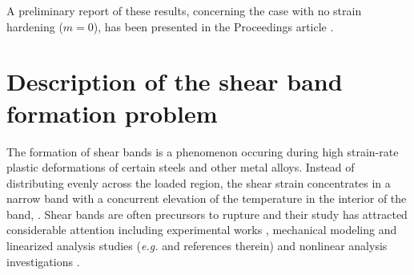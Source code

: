 \documentclass[11pt]{article}
\theoremstyle{remark}
\begin{document}



A preliminary report of these results, concerning the case with no strain hardening ($m = 0$), has been presented in the
Proceedings article \cite{KLT_HYP2016}.


\section{Description of the shear band formation problem}
\label{mathmodel}

The formation of shear bands \cite{CCHD,ZH}  is a phenomenon occuring during
high strain-rate plastic deformations of certain steels and other metal alloys. Instead of distributing evenly across the loaded region,
the shear strain concentrates in a narrow band with a concurrent elevation of the temperature in the interior of the band, \cite{ZH,CCHD,HDH}.
Shear bands are often precursors to rupture and their study has attracted considerable
attention including  experimental works  \cite{CCHD,HDH}, mechanical modeling
and  linearized analysis studies  ({\it e.g.} \cite{CDHS,FM,MC,wright_survey_2002} and references therein) and
nonlinear analysis investigations  \cite{DH_1983,Tz_1987,bertsch_effect_1991}.
\end{document}
